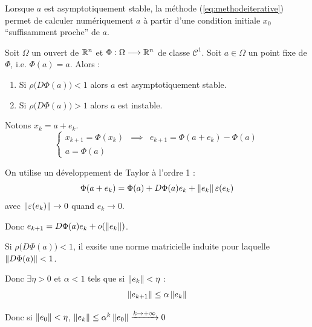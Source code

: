 Lorsque $a$ est asymptotiquement stable, la méthode (\ref{eq:methodeiterative}) permet de calculer numériquement $a$ à partir d'une condition initiale $x_0$ ``suffisamment proche'' de $a$.

\begin{ftheo}
    Soit $\Omega$ un ouvert de $\mathbb{R}^n$ et $\Phi : \Omega \longrightarrow \mathbb{R}^n$ de classe $\mathcal{C}^1$.
    Soit $a \in \Omega$ un point fixe de $\Phi$, i.e. $\Phi(a) = a$. Alors :
    \begin{enumerate}[label=\alph*)]
        \item Si $\rho \Big(D\Phi(a) \Big) < 1$ alors $a$ est asymptotiquement stable.
        \item Si $\rho \Big(D\Phi(a) \Big) > 1$ alors $a$ est instable.
    \end{enumerate}
\end{ftheo}


\begin{preuve}[du a)]
    Notons $x_k = a + e_k$.
    \begin{equation*}
        \left\lbrace
        \begin{array}{ccc}
            x_{k+1} = \Phi (x_k) & \implies & e_{k+1} = \Phi(a+e_k) - \Phi(a) \\
            a = \Phi(a)
        \end{array}
        \right.
    \end{equation*}

    On utilise un développement de Taylor à l'ordre 1 :
    \[
        \Phi(a+e_k) = \Phi(a) + D\Phi(a) e_k + \left\lVert e_k\right\rVert\varepsilon(e_k)
    \]
    avec $\left\lVert\varepsilon(e_k)\right\rVert \to 0$ quand $e_k \to 0$.


    \vspace{0.5cm}
    Donc $e_{k+1} = D\Phi(a) e_k + o(\left\lVert e_k\right\rVert)$.

    Si $\rho \big(D\Phi(a) \big) < 1$, il exsite une norme matricielle induite pour
laquelle $\left\lVert D\Phi(a)\right\rVert<1$.

    Donc $\exists \eta > 0$ et $\alpha < 1$ tels que si $\left\lVert e_k\right\rVert < \eta$ :
    \[
        \left\lVert e_{k+1}\right\rVert \leq \alpha \left\lVert e_k\right\rVert
    \]

    Donc si $\left\lVert e_0\right\rVert < \eta$, $\left\lVert e_k\right\rVert \leq \alpha^k \left\lVert e_0\right\rVert \xrightarrow{k \to +\infty}0$
\end{preuve}

